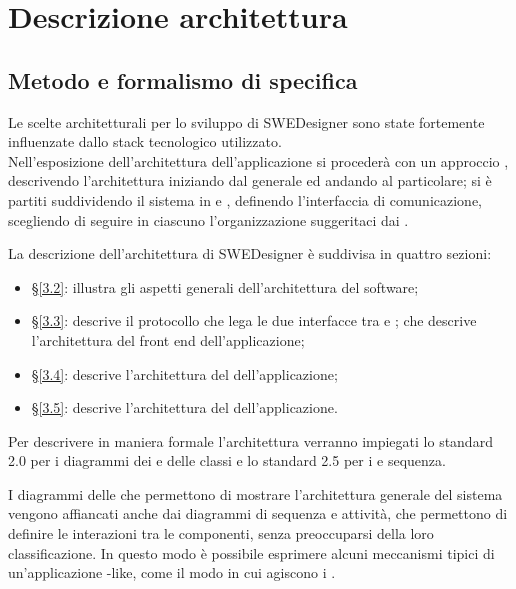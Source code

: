 \section{Descrizione architettura }
	\subsection{Metodo e formalismo di specifica}
Le scelte architetturali per lo sviluppo di SWEDesigner sono state fortemente influenzate dallo stack tecnologico utilizzato. \\

Nell’esposizione dell’architettura dell'applicazione si procederà con un approccio , descrivendo l'architettura iniziando dal generale ed andando al particolare; si è partiti suddividendo il sistema in  e , definendo l'interfaccia di comunicazione, scegliendo di seguire in ciascuno l'organizzazione suggeritaci dai .

La descrizione dell’architettura di SWEDesigner è suddivisa in quattro sezioni:
\begin{itemize}
\item \S\ref{3.2}: illustra gli aspetti generali dell’architettura del software;
\item \S\ref{3.3}: descrive il protocollo che lega le due interfacce tra  e ;
che descrive l’architettura del front end dell’applicazione;
\item \S\ref{3.4}: descrive l’architettura del  dell’applicazione;
\item \S\ref{3.5}: descrive l’architettura del  dell’applicazione.

\end{itemize}

Per descrivere in maniera formale l'architettura verranno impiegati lo standard  2.0 per i diagrammi dei  e delle classi e lo standard  2.5 per i  e sequenza.

I diagrammi delle  che permettono di mostrare l'architettura generale del sistema vengono affiancati anche dai diagrammi di sequenza e attività, che permettono di definire le interazioni tra le componenti, senza preoccuparsi della loro classificazione.
In questo modo è possibile esprimere alcuni meccanismi tipici di un’applicazione
-like, come il modo in cui agiscono i .

